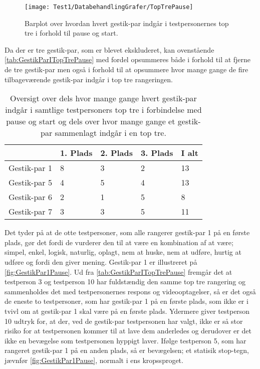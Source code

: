 %
\begin{figure}[H]
	\centering
	\texttt{[image: Test1/DatabehandlingGrafer/TopTrePause]}
	\caption{Barplot over hvordan hvert gestik-par indgår i testpersonernes top tre i forhold til pause og start.}
	\label{fig:SamletTopTrePause}
\end{figure}
\noindent
%
Da der er tre gestik-par, som er blevet ekskluderet, kan ovenstående  \autoref{tab:GestikParITopTrePause} med fordel opsummeres både i forhold til at fjerne de tre gestik-par men også i forhold til at opsummere hvor mange gange de fire tilbageværende gestik-par indgår i top tre rangeringen. 
%
\begin{table}[H]
	\centering
	\begin{tabular}{ | p{2.4cm} | p{2.4cm} | p{2.4cm} | p{2.4cm} |p{2.4cm}|}
	\hline
		 & 1. Plads & 2. Plads & 3. Plads & I alt \\ \hline
		Gestik-par 1 & 8 & 3 & 2 & 13\\ \hline
		Gestik-par 5 & 4 & 5 & 4 & 13\\ \hline
		Gestik-par 6 & 2 & 1 & 5 & 8\\ \hline 
		Gestik-par 7 & 3 & 3 & 5 & 11\\ \hline
	\end{tabular}
	\caption{Oversigt over dels hvor mange gange hvert gestik-par indgår i samtlige testpersoners top tre i forbindelse med pause og start og dels over hvor mange gange et gestik-par sammenlagt indgår i en top tre.}
	\label{tab:GestikParITopTrePauseOversigt}
\end{table}
\noindent
%
Det tyder på at de otte testpersoner, som alle rangerer gestik-par 1 på en første plads, gør det fordi de vurderer den til at være en kombination af at være; simpel, enkel, logisk, naturlig, oplagt, nem at huske, nem at udføre, hurtig at udføre og fordi den giver mening. Gestik-par 1 er illustreret på \autoref{fig:GestikPar1Pause}. Ud fra \autoref{tab:GestikParITopTrePause} fremgår det at testperson 3 og testperson 10 har fuldstændig den samme top tre rangering og sammenholdes det med testpersonernes respons og videooptagelser, så er det også de eneste to testpersoner, som har gestik-par 1 på en første plads, som ikke er i tvivl om at gestik-par 1 skal være på en første plads. Ydermere giver testperson 10 udtryk for, at der, ved de gestik-par testpersonen har valgt, ikke er så stor risiko for at testpersonen kommer til at lave dem anderledes og derudover er det ikke en bevægelse som testpersonen hyppigt laver. Ifølge testperson 5, som har rangeret gestik-par 1 på en anden plads, så er bevægelsen; et statisik stop-tegn, jævnfør \autoref{fig:GestikPar1Pause}, normalt i ens kropssproget.   

